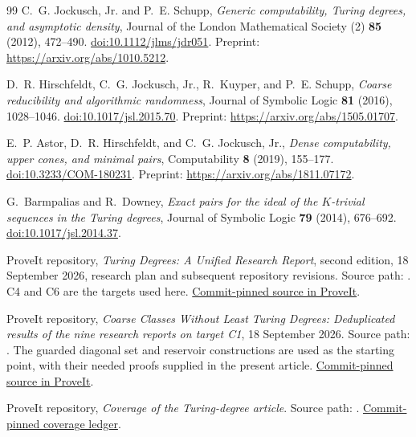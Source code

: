 \documentclass[11pt,letterpaper]{article}
\theoremstyle{definition}
\theoremstyle{remark}\newtheorem{remark}[theorem]{Remark}
\numberwithin{equation}{section}
\begin{document}
\begin{thebibliography}{99}
C.~G. Jockusch, Jr. and P.~E. Schupp,
\emph{Generic computability, Turing degrees, and asymptotic density},
Journal of the London Mathematical Society (2) \textbf{85} (2012), 472--490.
\href{https://doi.org/10.1112/jlms/jdr051}{doi:10.1112/jlms/jdr051}.
Preprint: \url{https://arxiv.org/abs/1010.5212}.

D.~R. Hirschfeldt, C.~G. Jockusch, Jr., R.~Kuyper, and P.~E. Schupp,
\emph{Coarse reducibility and algorithmic randomness},
Journal of Symbolic Logic \textbf{81} (2016), 1028--1046.
\href{https://doi.org/10.1017/jsl.2015.70}{doi:10.1017/jsl.2015.70}.
Preprint: \url{https://arxiv.org/abs/1505.01707}.

E.~P. Astor, D.~R. Hirschfeldt, and C.~G. Jockusch, Jr.,
\emph{Dense computability, upper cones, and minimal pairs},
Computability \textbf{8} (2019), 155--177.
\href{https://doi.org/10.3233/COM-180231}{doi:10.3233/COM-180231}.
Preprint: \url{https://arxiv.org/abs/1811.07172}.

G.~Barmpalias and R.~Downey,
\emph{Exact pairs for the ideal of the $K$-trivial sequences in the Turing degrees},
Journal of Symbolic Logic \textbf{79} (2014), 676--692.
\href{https://doi.org/10.1017/jsl.2014.37}{doi:10.1017/jsl.2014.37}.

ProveIt repository,
\emph{Turing Degrees: A Unified Research Report}, second edition,
18 September 2026, research plan and subsequent repository revisions.
Source path:
.
C4 and C6 are the targets used here.
\href{https://github.com/VladimirReshetnikov/ProveIt/blob/6c9175a54bcaad3bfc2d416257d2b7d3dff2c1e0/Computability/TuringDegrees/Research/CoarseDegrees/research-plan/turing_degrees_unified.tex}{Commit-pinned source in ProveIt}.

ProveIt repository,
\emph{Coarse Classes Without Least Turing Degrees: Deduplicated results of the nine research reports on target C1},
18 September 2026.
Source path:
.
The guarded diagonal set and reservoir constructions are used as the starting point, with their needed proofs supplied in the present article.
\href{https://github.com/VladimirReshetnikov/ProveIt/blob/6c9175a54bcaad3bfc2d416257d2b7d3dff2c1e0/Computability/TuringDegrees/Research/CoarseDegrees/research-synthesis/Turing_Degrees_Synthesis.tex}{Commit-pinned source in ProveIt}.

ProveIt repository,
\emph{Coverage of the Turing-degree article}.
Source path: .
\href{https://github.com/VladimirReshetnikov/ProveIt/blob/6c9175a54bcaad3bfc2d416257d2b7d3dff2c1e0/Computability/TuringDegrees/COVERAGE.md}{Commit-pinned coverage ledger}.

\end{thebibliography}
\end{document}
